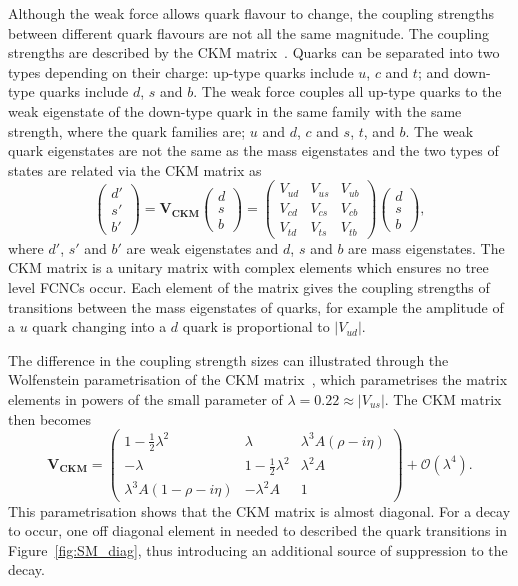 Although the weak force allows quark flavour to change, the coupling strengths between different quark flavours are not all the same magnitude. The coupling strengths are described by the CKM matrix~\cite{PhysRevLett.10.531,doi:10.1143/PTP.49.652}. Quarks can be separated into two types depending on their charge: up-type quarks include $u$, $c$ and $t$; and down-type quarks include $d$, $s$ and $b$. The weak force couples all up-type quarks to the weak eigenstate of the down-type quark in the same family with the same strength, where the quark families are; $u$ and $d$, $c$ and $s$, $t$, and $b$. The weak quark eigenstates are not the same as the mass eigenstates and the two types of states are related via the CKM matrix as
\begin{equation}
\begin{pmatrix}
d'\\
s'\\
b'
\end{pmatrix}
= 
\mathbf{V_{CKM}}
\begin{pmatrix}
d\\
s\\
b
\end{pmatrix} =
 \begin{pmatrix}
   V_{ud} & V_{us} & V_{ub} \\
   V_{cd} & V_{cs} & V_{cb} \\
   V_{td} & V_{ts} & V_{tb}
 \end{pmatrix}
\begin{pmatrix}
d\\
s\\
b
\end{pmatrix},
\label{eq:CKMA}
\end{equation}
where $d'$, $s'$ and $b'$ are weak eigenstates and $d$, $s$ and $b$ are mass eigenstates. The CKM matrix is a unitary matrix with complex elements which ensures no tree level FCNCs occur. Each element of the matrix gives the coupling strengths of transitions between the mass eigenstates of quarks, for example the amplitude of a $u$ quark changing into a $d$ quark is proportional to $|V_{ud}|$.

The difference in the coupling strength sizes can illustrated through the Wolfenstein parametrisation of the CKM matrix~\cite{PhysRevLett.51.1945}, which parametrises the matrix elements in powers of the small parameter of $\lambda = 0.22 \approx |V_{us}|$. The CKM matrix then becomes
\begin{equation}
\mathbf{V_{CKM}} =
 \begin{pmatrix}
 1 - \frac{1}{2}\lambda^2 & \lambda & \lambda^3 A (\rho - i \eta) \\
 - \lambda                & 1 - \frac{1}{2}\lambda^2 & \lambda^2 A \\
 \lambda^3 A (1 - \rho- i \eta) & -\lambda^2 A & 1
 \end{pmatrix} + \mathcal{O}(\lambda^4).
\label{eq:CKMB}
\end{equation}
This parametrisation shows that the CKM matrix is almost diagonal. For a \bmumu decay to occur, one off diagonal element in needed to described the quark transitions in Figure~\ref{fig:SM_diag}, thus introducing an additional source of suppression to the decay. 


